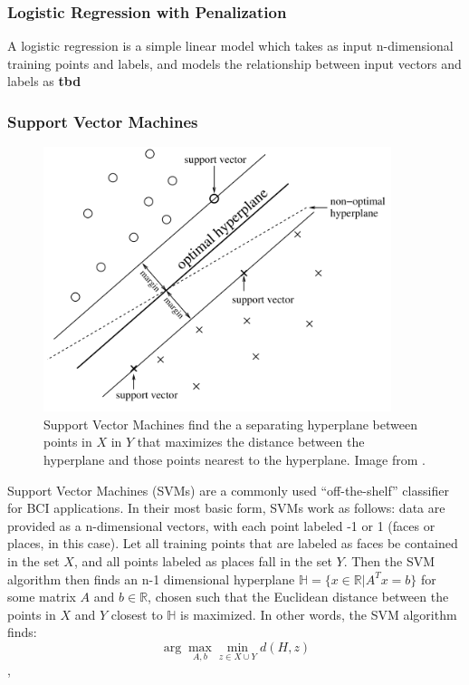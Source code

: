 \documentclass[12pt]{report}
\newcommand{\argmax}{\arg\!\max}
\begin{document}
\subsubsection{Logistic Regression with Penalization}

A logistic regression is a simple linear model which takes as input n-dimensional training points and labels, and models the relationship between input vectors and labels as {\bf tbd}

\subsubsection{Support Vector Machines}

\begin{figure}[t]
\centering
\includegraphics[width=4in]{svm}
\caption{Support Vector Machines find the a separating hyperplane between points in $X$ in $Y$ that maximizes the distance between the hyperplane and those points nearest to the hyperplane. Image from \cite{Lotte}.}
\end{figure}

	Support Vector Machines (SVMs) are a commonly used ``off-the-shelf'' classifier for BCI applications.  In their most basic form, SVMs work as follows:  data are provided as a n-dimensional vectors, with each point labeled -1 or 1 (faces or places, in this case).  Let all training points that are labeled as faces be contained in the set $X$, and all points labeled as places fall in the set $Y$.  Then the SVM algorithm then finds an n-1 dimensional hyperplane $\mathbb{H} = \{x\in \mathbb{R}| A^Tx=b\}$ for some matrix $A$ and $b\in \mathbb{R}$, chosen such that the Euclidean distance between the points in $X$ and $Y$ closest to $\mathbb{H}$ is maximized.  In other words, the SVM algorithm finds:
		$$ \argmax_{A,b} \min_{z\in X\cup Y} d(H,z) $$,
		
\end{document}
